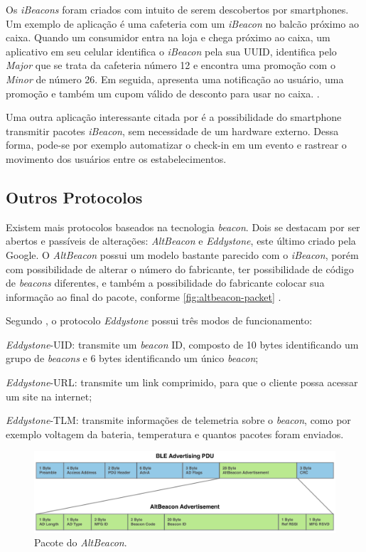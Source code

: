 Os \textit{iBeacons} foram criados com intuito de serem descobertos por smartphones. Um exemplo de aplicação é uma cafeteria com um \textit{iBeacon} no balcão próximo ao caixa. Quando um consumidor entra na loja e chega próximo ao caixa, um aplicativo em seu celular identifica o \textit{iBeacon} pela sua UUID, identifica pelo \textit{Major} que se trata da cafeteria número 12 e encontra uma promoção com o \textit{Minor} de número 26. Em seguida, apresenta uma notificação ao usuário, uma promoção e também um cupom válido de desconto para usar no caixa. \cite{arm-beacons}.

Uma outra aplicação interessante citada por  é a possibilidade do smartphone transmitir pacotes \textit{iBeacon}, sem necessidade de um hardware externo. Dessa forma, pode-se por exemplo automatizar o check-in em um evento e rastrear o movimento dos usuários entre os estabelecimentos.

\subsection{Outros Protocolos}\label{sec:outros-protocolos}

Existem mais protocolos baseados na tecnologia \textit{beacon}. Dois se destacam por ser abertos e passíveis de alterações: \textit{AltBeacon} e \textit{Eddystone}, este último criado pela Google. O \textit{AltBeacon} possui um modelo bastante parecido com o \textit{iBeacon}, porém com possibilidade de alterar o número do fabricante, ter possibilidade de código de \textit{beacons} diferentes, e também a possibilidade do fabricante colocar sua informação ao final do pacote, conforme \autoref{fig:altbeacon-packet} \cite{arm-beacons}.

Segundo , o protocolo \textit{Eddystone} possui três modos de funcionamento:
\begin{alineas}
	\item \textit{Eddystone}-UID: transmite um \textit{beacon} ID, composto de 10 bytes identificando um grupo de \textit{beacons} e  6 bytes identificando um único \textit{beacon};
	\item \textit{Eddystone}-URL: transmite um link comprimido, para que o cliente possa acessar um site na internet;
	\item \textit{Eddystone}-TLM: transmite informações de telemetria sobre o \textit{beacon}, como por exemplo voltagem da bateria, temperatura e quantos pacotes foram enviados.
\end{alineas}

\begin{figure}[htb]
	\caption{\label{fig:altbeacon-packet}Pacote do \textit{AltBeacon}.}
	\begin{center}
		\includegraphics[width=1\textwidth]{img/altbeacon-packet.png}
	\end{center}
\end{figure}

